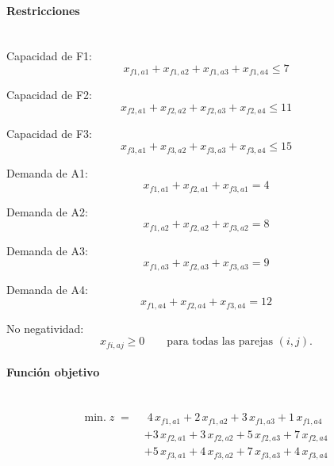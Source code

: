 \paragraph{Restricciones}\mbox{}\\

Capacidad de F1:
\begin{equation}
    x_{f1,a1} + x_{f1,a2} + x_{f1,a3} + x_{f1,a4} \leq 7
\end{equation}

Capacidad de F2:
\begin{equation}
    x_{f2,a1} + x_{f2,a2} + x_{f2,a3} + x_{f2,a4} \leq 11
\end{equation}

Capacidad de F3:
\begin{equation}
    x_{f3,a1} + x_{f3,a2} + x_{f3,a3} + x_{f3,a4} \leq 15
\end{equation}

Demanda de A1:
\begin{equation}
    x_{f1,a1} + x_{f2,a1} + x_{f3,a1} = 4
\end{equation}

Demanda de A2:
\begin{equation}
    x_{f1,a2} + x_{f2,a2} + x_{f3,a2} = 8
\end{equation}

Demanda de A3:
\begin{equation}
    x_{f1,a3} + x_{f2,a3} + x_{f3,a3} = 9
\end{equation}

Demanda de A4:
\begin{equation}
    x_{f1,a4} + x_{f2,a4} + x_{f3,a4} = 12
\end{equation}

No negatividad:
\begin{equation}
    x_{f i, a j} \geq 0 \qquad \text{para todas las parejas } (i,j).
\end{equation}

\paragraph{Función objetivo}\mbox{}\\
\begin{equation}
\begin{split}
\mbox{min.}\; z \;=\;
&\; 4\,x_{f1,a1} + 2\,x_{f1,a2} + 3\,x_{f1,a3} + 1\,x_{f1,a4} \\
&+ 3\,x_{f2,a1} + 3\,x_{f2,a2} + 5\,x_{f2,a3} + 7\,x_{f2,a4} \\
&+ 5\,x_{f3,a1} + 4\,x_{f3,a2} + 7\,x_{f3,a3} + 4\,x_{f3,a4}
\end{split}
\end{equation}

